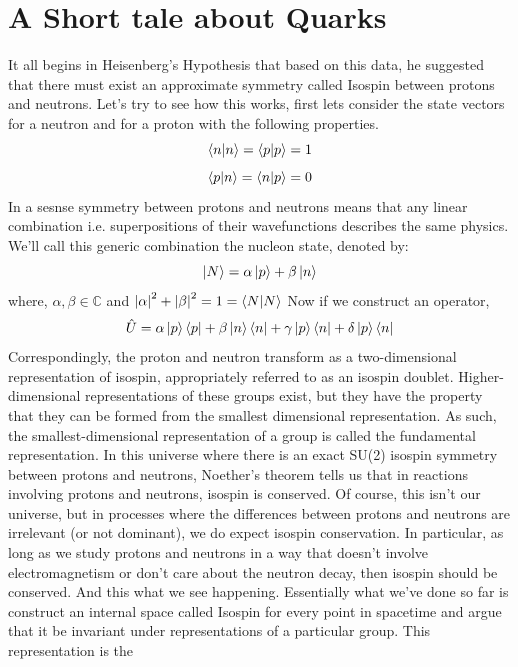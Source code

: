 \documentclass[]{article}
\begin{document}
\section{A Short tale about Quarks}
It all begins in Heisenberg's Hypothesis that based on this data,
he suggested that there must exist an approximate symmetry called Isospin between protons and neutrons. Let's try to see how this works, first lets consider the state vectors for a neutron and for a proton with the following properties.
\begin{equation}
\braket{n}{n} = \braket{p}{p} = 1
\end{equation}
\begin{equation}
\braket{p}{n} = \braket{n}{p} = 0
\end{equation}
In a sesnse symmetry between protons and neutrons means that any linear combination i.e. superpositions of their wavefunctions describes the same physics. We'll call this generic combination the nucleon state, denoted by:
\begin{equation}
\ket{N} = \alpha \ket{p} +  \beta \ket{n}
\end{equation}
where, $\alpha, \beta \in \mathbb{C}$ and $\abs{\alpha}^{2} + \abs{\beta}^{2} = 1 = \braket{N}{N}$
Now if we construct an operator,
\begin{equation}
\hat{U} = \alpha \ket{p} \bra{p} + \beta \ket{n} \bra{n} + \gamma \ket{p} \bra{n} + \delta \ket{p} \bra{n}
\end{equation}
Correspondingly, the proton and neutron transform as a two-dimensional representation of isospin, appropriately referred to as an isospin doublet. Higher-dimensional representations of these groups exist, but they have the property that they can be formed from the smallest dimensional representation. As such, the smallest-dimensional representation of a group is called the fundamental representation.
In this universe where there is an exact SU(2) isospin symmetry between protons and neutrons, Noether’s theorem tells us that in reactions involving protons and neutrons, isospin is conserved. Of course, this isn’t our universe, but in processes where the differences between protons and neutrons are irrelevant (or not dominant), we do expect isospin conservation. In particular,
as long as we study protons and neutrons in a way that doesn’t involve electromagnetism or don’t care about the neutron decay, then isospin should be conserved. And this what we see happening. Essentially what we've done so far is construct an internal space called Isospin for every point in spacetime and argue that it be invariant under representations of a particular group. This representation is the 
\end{document}
